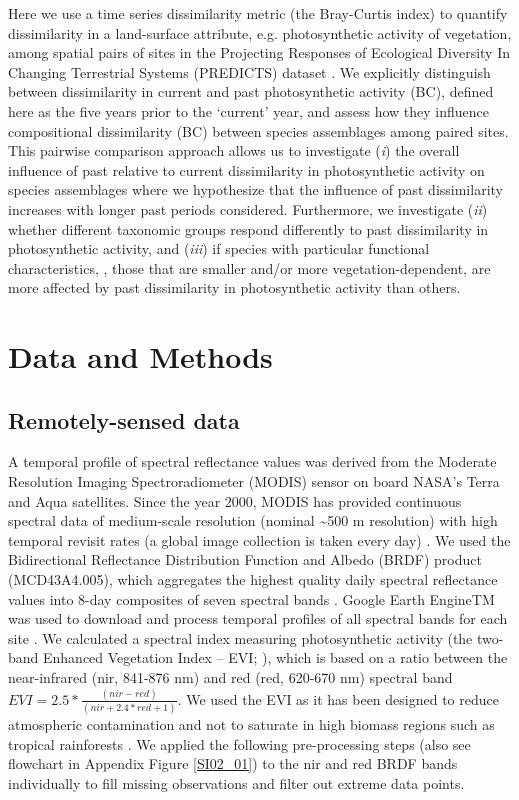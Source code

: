 Here we use a time series dissimilarity metric (the Bray-Curtis index) to quantify dissimilarity in a land-surface attribute, e.g. photosynthetic activity of vegetation, among spatial pairs of sites in the Projecting Responses of Ecological Diversity In Changing Terrestrial Systems (PREDICTS) dataset \citep{Hudson2016}. We explicitly distinguish between dissimilarity in current and past photosynthetic activity (BC), defined here as the five years prior to the ‘current’ year, and assess how they influence compositional dissimilarity (BC) between species assemblages among paired sites. This pairwise comparison approach allows us to investigate (\textit{i}) the overall influence of past relative to current dissimilarity in photosynthetic activity on species assemblages where we hypothesize that the influence of past dissimilarity increases with longer past periods considered. Furthermore, we investigate (\textit{ii}) whether different taxonomic groups respond differently to past dissimilarity in photosynthetic activity, and (\textit{iii}) if species with particular functional characteristics, \ie, those that are smaller and/or more vegetation-dependent, are more affected by past dissimilarity in photosynthetic activity than others. 


\section{Data and Methods}
\label{C02_02}
\subsection{Remotely-sensed data}
\label{C02_0201}
A temporal profile of spectral reflectance values was derived from the Moderate Resolution Imaging Spectroradiometer (MODIS) sensor on board NASA’s Terra and Aqua satellites. Since the year 2000, MODIS has provided continuous spectral data of medium-scale resolution (nominal \textasciitilde500 m resolution) with high temporal revisit rates (a global image collection is taken every day) \citep{Schaaf2002}. We used the Bidirectional Reflectance Distribution Function and Albedo (BRDF) product (MCD43A4.005), which aggregates the highest quality daily spectral reflectance values into 8-day composites of seven spectral bands \citep{Schaaf2002}. Google Earth EngineTM was used to download and process temporal profiles of all spectral bands for each site \citep{Gorelick2017}. We calculated a spectral index measuring photosynthetic activity (the two-band Enhanced Vegetation Index – EVI; \cite{Jiang2008}), which is based on a ratio between the near-infrared (nir, 841-876 nm) and red (red, 620-670 nm) spectral band \( EVI = 2.5 * \frac{(nir - red)}{(nir + 2.4 * red + 1)} \). We used the EVI as it has been designed to reduce atmospheric contamination and not to saturate in high biomass regions such as tropical rainforests \citep{Huete2002,Jiang2008}. We applied the following pre-processing steps (also see flowchart in Appendix Figure \ref{SI02_01}) to the nir and red BRDF bands individually to fill missing observations and filter out extreme data points. 

